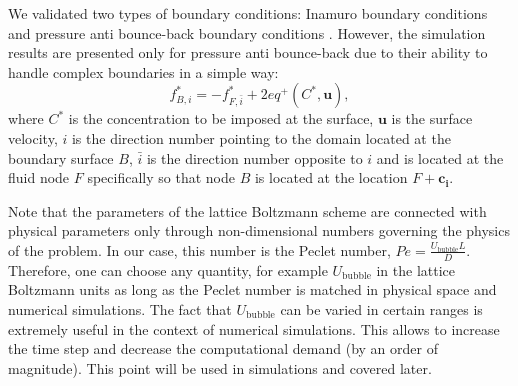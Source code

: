 \documentclass[preprint,12pt]{elsarticle}
\newcommand{\beq}{\begin{equation}}
\newcommand{\feq}{\end{equation}}
\newcommand{\ububble}{U_{\mathrm{bubble}}}
\newcommand{\cstar}{C^{*}}
\begin{document}

We validated
two types of boundary conditions: Inamuro boundary conditions \cite{inamuro-scalar-boundary} and
pressure anti bounce-back boundary conditions \cite{ginzburg-multireflection}. However, the
simulation results  are presented only for pressure anti bounce-back due to their ability
to handle complex boundaries in a simple way:
\beq
\label{antibb}
f^{*}_{B,i}=-f^{*}_{F,\bar{i}} + 2 eq^+(\cstar,\bm{u}),
\feq
where $\cstar$ is the concentration to be imposed at the surface, $\bm{u}$ is the surface velocity,
$i$ is the direction number pointing to the domain located at the boundary surface $B$,
$\bar{i}$ is the direction number opposite to $i$ and is located at the fluid node $F$ specifically
so that node $B$ is located at the location $F+\bm{c_i}$. 

Note that the parameters of the lattice
Boltzmann scheme are connected with  physical parameters only through  non-dimensional
numbers governing the physics of the problem. In our case, this number is the Peclet number, $Pe=\frac{\ububble L}{D}$.
Therefore, one can choose any quantity, for example 
$\ububble$ in the lattice Boltzmann units as long as the
Peclet number is  matched in physical space and numerical simulations. The fact that $\ububble$
can be varied in certain ranges  is extremely useful in the context of numerical simulations. This allows to 
increase the time step and decrease the computational demand (by an order of magnitude). 
This point will be used in simulations and covered later. 
\end{document}
